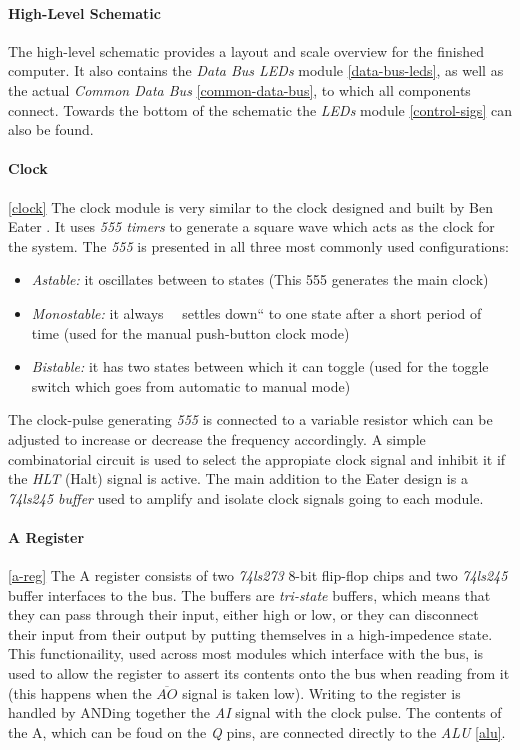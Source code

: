 \paragraph{High-Level Schematic}
The high-level schematic provides a layout and scale overview for the finished computer. It also contains the \emph{Data Bus LEDs}
module \ref{data-bus-leds}, as well as the actual \emph{Common Data Bus} \ref{common-data-bus}, to which all components connect.
Towards the bottom of the schematic the \emph{LEDs} module \ref{control-sigs} can also be found.


\clearpage

\paragraph{Clock} \ref{clock}
The clock module is very similar to the clock designed and built by Ben Eater \cite{eater2020clock}. It uses \emph{555 timers}
\cite{555} to generate a square wave which acts as the clock for the system. The \emph{555} is presented in all three most commonly
used configurations:
\begin{itemize}
  \item \emph{Astable: } it oscillates between to states (This 555 generates the main clock)
  \item \emph{Monostable: } it always ~~settles down`` to one state after a short period of time (used for the manual push-button
  clock mode)
  \item \emph{Bistable: } it has two states between which it can toggle (used for the toggle switch which goes from automatic to
  manual mode)
\end{itemize}
The clock-pulse generating \emph{555} is connected to a variable resistor which can be adjusted to increase or decrease the
frequency accordingly. A simple combinatorial circuit is used to select the appropiate clock signal and inhibit it if the \emph{HLT}
 (Halt) signal is active. The main addition to the Eater design is a \emph{74ls245 buffer} \cite{74ls245} used to amplify and
 isolate clock signals going to each module.

 

\paragraph{A Register} \ref{a-reg}
The A register consists of two \emph{74ls273} \cite{74ls273} 8-bit flip-flop chips and two \emph{74ls245} \cite{74ls245} buffer
interfaces to the bus. The buffers are \emph{tri-state} buffers, which means that they can pass through their input, either high or
low, or they can  disconnect their input from their output by putting themselves in a high-impedence state. This functionaility,
used across most modules which interface with the bus, is used to allow the register to assert its contents onto the bus when
reading from it (this happens when the \emph{$\overline{AO}$} signal is taken low). Writing to the register is handled by
ANDing together the \emph{AI} signal with the clock pulse. The contents of the A, which can be foud on the \emph{Q} pins, are
connected directly to the \emph{ALU} \ref{alu}.

